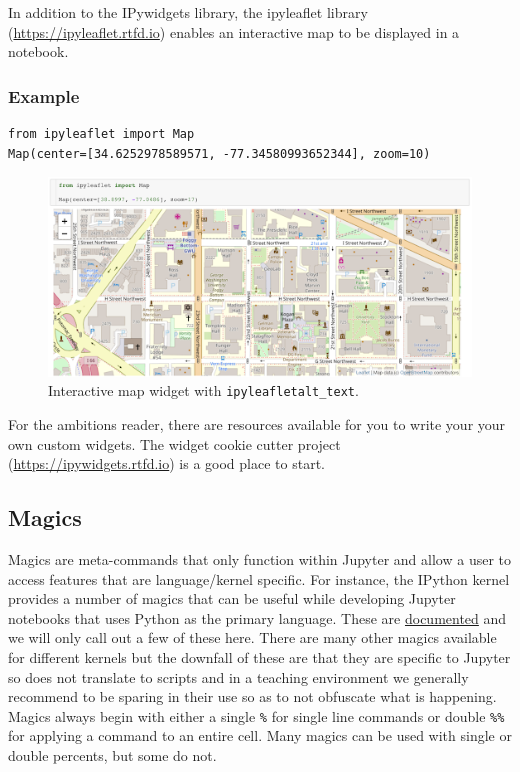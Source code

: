 \documentclass[]{book}
\begin{document}
In addition to the IPywidgets library, the ipyleaflet library
(\url{https://ipyleaflet.rtfd.io}) enables an interactive map to be
displayed in a notebook.

\subsubsection{Example}\label{example}

\begin{verbatim}
from ipyleaflet import Map
Map(center=[34.6252978589571, -77.34580993652344], zoom=10)
\end{verbatim}

\begin{figure}
\centering
\includegraphics{images/chapter52.png}
\caption{Interactive map widget with \texttt{ipyleafletalt\_text}.}
\end{figure}

For the ambitions reader, there are resources available for you to write
your your own custom widgets. The widget cookie cutter project
(\url{https://ipywidgets.rtfd.io}) is a good place to start.

\subsection{Magics}\label{magics}

Magics are meta-commands that only function within Jupyter and allow a
user to access features that are language/kernel specific. For instance,
the IPython kernel provides a number of magics that can be useful while
developing Jupyter notebooks that uses Python as the primary language.
These are
\href{https://ipython.readthedocs.io/en/stable/interactive/magics.html}{documented}
and we will only call out a few of these here. There are many other
magics available for different kernels but the downfall of these are
that they are specific to Jupyter so does not translate to scripts and
in a teaching environment we generally recommend to be sparing in their
use so as to not obfuscate what is happening. Magics always begin with
either a single \texttt{\%} for single line commands or double
\texttt{\%\%} for applying a command to an entire cell. Many magics can
be used with single or double percents, but some do not.
\end{document}
